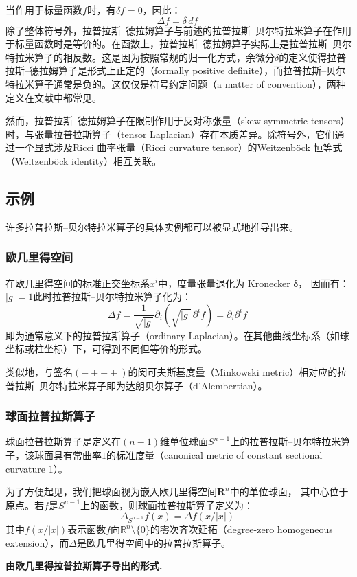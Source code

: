 当作用于标量函数$f$时，有$\delta f = 0$，因此：
\[
\Delta f = \delta\, df~
\]
除了整体符号外，拉普拉斯–德拉姆算子与前述的拉普拉斯–贝尔特拉米算子在作用于标量函数时是等价的。在函数上，拉普拉斯–德拉姆算子实际上是拉普拉斯–贝尔特拉米算子的相反数。这是因为按照常规的归一化方式，余微分$\delta$的定义使得拉普拉斯–德拉姆算子是形式上正定的（formally positive definite），而拉普拉斯–贝尔特拉米算子通常是负的。这仅仅是符号约定问题（a matter of convention），两种定义在文献中都常见。

然而，拉普拉斯–德拉姆算子在限制作用于反对称张量（skew-symmetric tensors）时，与张量拉普拉斯算子（tensor Laplacian）存在本质差异。除符号外，它们通过一个显式涉及Ricci 曲率张量（Ricci curvature tensor）的Weitzenböck 恒等式（Weitzenböck identity）相互关联。
\subsection{示例}
许多拉普拉斯–贝尔特拉米算子的具体实例都可以被显式地推导出来。
\subsubsection{欧几里得空间}
在欧几里得空间的标准正交坐标系$x^{i}$中，度量张量退化为 Kronecker δ，
因而有：$|g| = 1$此时拉普拉斯–贝尔特拉米算子化为：
\[
\Delta f
= \frac{1}{\sqrt{|g|}} \partial_{i} \left( \sqrt{|g|}\, \partial^{i} f \right)
= \partial_{i} \partial^{i} f~
\]
即为通常意义下的拉普拉斯算子（ordinary Laplacian）。在其他曲线坐标系（如球坐标或柱坐标）下，可得到不同但等价的形式。

类似地，与签名$(- + + +)$的闵可夫斯基度量（Minkowski metric）相对应的拉普拉斯–贝尔特拉米算子即为达朗贝尔算子（d’Alembertian）。
\subsubsection{球面拉普拉斯算子}
球面拉普拉斯算子是定义在$(n-1)$维单位球面$S^{n-1}$上的拉普拉斯–贝尔特拉米算子，该球面具有常曲率$1$的标准度量（canonical metric of constant sectional curvature 1）。

为了方便起见，我们把球面视为嵌入欧几里得空间$\mathbf{R}^{n}$中的单位球面，
其中心位于原点。若$f$是$S^{n-1}$上的函数，则球面拉普拉斯算子定义为：
\[
\Delta_{S^{n-1}} f(x)
= \Delta f\!\left(x/|x| \right)~
\]
其中$f(x/|x|)$表示函数$f$向$\mathbb{R}^{n} \setminus \{0\}$的零次齐次延拓（degree-zero homogeneous extension），而$\Delta$是欧几里得空间中的拉普拉斯算子。

\textbf{由欧几里得拉普拉斯算子导出的形式.}

